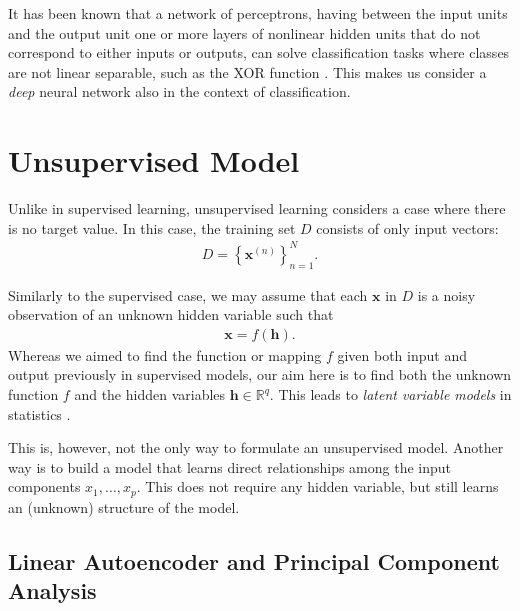 \documentclass{now}
\newcommand{\vect}[1]{\mathbf{#1}}
\newcommand{\vh}[0]{\vect{h}}
\newcommand{\vx}[0]{\vect{x}}
\newcommand{\RR}[0]{\mathbb{R}}
\begin{document}
It has been known that a network of perceptrons, having
between the input units and the output unit one or more
layers of nonlinear hidden units that do not correspond to
either inputs or outputs, can solve classification tasks
where classes are not linear separable, such as the XOR
function \citep[see, e.g.,][]{Touretzky1989}. This makes us
consider a \textit{deep} neural network also in the context
of classification.




\section{Unsupervised Model}
\label{sec:unsupervised_model}

Unlike in supervised learning, unsupervised learning
considers a case where there is no target value. 
In this case, the training set $D$ consists of only input
vectors:
\begin{align}
    \label{eq:unsup_train}
    D=\left\{ \vx^{(n)} \right\}_{n=1}^N.
\end{align}

Similarly to the supervised case, we may assume that each
$\vx$ in $D$ is a noisy observation of an unknown hidden
variable such that
\begin{align}
    \label{eq:lvm}
    \vx = f(\vh). %
\end{align}
Whereas we aimed
to find the function or mapping $f$ given both input and
output previously in supervised models, our aim here is to
find both the unknown function $f$ and the hidden variables
$\vh \in \RR^q$. This leads to \textit{latent variable
models} in statistics \citep[see, e.g.,][]{Murphy2012}.

This is, however, not the only way to formulate an
unsupervised model. Another way is to build a model that
learns direct relationships among the input components $x_1,
\dots, x_p$. This does not require any hidden variable, but
still learns an (unknown) structure of the model.


\subsection{Linear Autoencoder and Principal Component Analysis}
\label{sec:linear_autoencoder}
\end{document}
